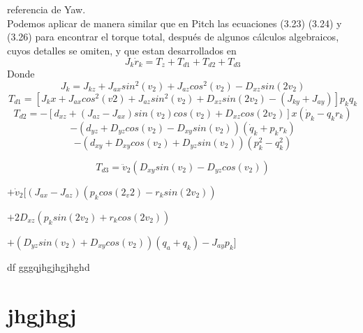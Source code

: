 referencia de Yaw.\\
Podemos aplicar de manera similar que en Pitch las ecuaciones (3.23) (3.24) y (3.26) para
encontrar el torque total, después de algunos cálculos algebraicos, cuyos detalles se omiten,
y que estan desarrollados en \cite{Paper::Yoon2001}
\begin{equation}
	J_k\dot{r}_k = T_z + T_{d1} + T_{d2} + T_{d3}
\end{equation}
Donde
\begin{equation}
	J_k = J_{kz} + J_{ax}sin^2(v_2) + J_{az}cos^2(v_2)- D_{xz}
	sin(2v_2)
\end{equation}
\begin{equation}
	T_{d1} = [J_kx + J_{ax}cos^2(v2) + J_{az}sin^2(v_2) +
			D_{xz}sin(2v_2)-(J_{ky} + J_{ay})]p_kq_k
\end{equation}
\begin{equation}
	T_{d2} = -[d_{xz} + (J_{az} - J_{ax})sin(v_2)cos(v_2)+
	D_{xz}cos(2v_2)] x (\dot{p}_k - q_kr_k)
\end{equation}
\begin{equation}\nonumber
	-(d_{yz} + D_{yz}cos(v_2) - D_{xy}sin(v_2))(\dot{q}_k + p_kr_k)
\end{equation}
\begin{equation}\nonumber
	-(d_{xy} + D_{xy}cos(v_2) + D_{yz}sin(v_2))(p^2_k - q^2_k)
\end{equation}

\begin{equation}
	T_{d3} = \ddot{v}_2(D_{xy}sin(v_2)-D_{yz}cos(v_2))
\end{equation}
\begin{center}
	$+ \dot{v}_2[(J_{ax}-J_{az})(p_kcos(2_v2)-r_ksin(2v_2))$
\end{center}
\begin{center}
	$+2D_{xz}(p_ksin(2v_2)+r_kcos(2v_2))$
\end{center}
\begin{center}
	$
	+(D_{yz}sin(v_2) + D_{xy}cos(v_2))(q_a+q_k) - J_{ay}p_k]
	$
\end{center}
df
gggqjhgjhgjhghd
\section{jhgjhgj}
